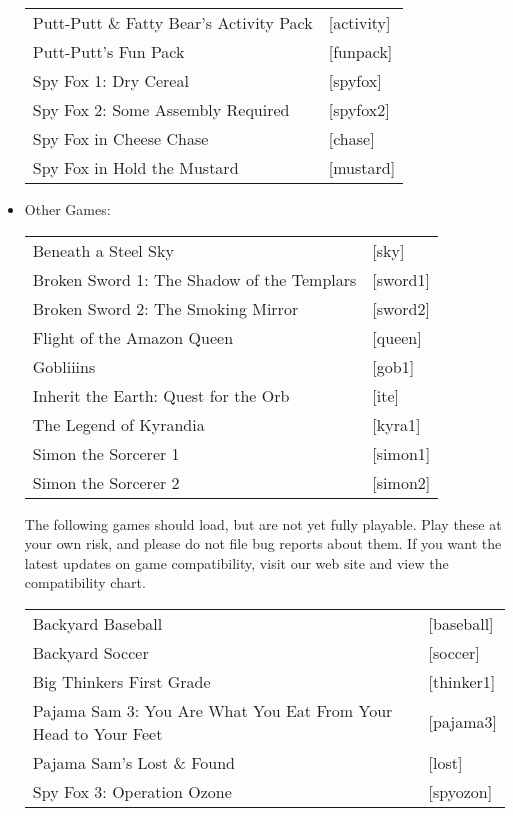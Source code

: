 \begin{itemize}
\begin{tabular}[h]{ll}
    Putt-Putt \& Fatty Bear's Activity Pack&                       [activity]\\
    Putt-Putt's Fun Pack&                                          [funpack]\\
    Spy Fox 1: Dry Cereal&                                         [spyfox]\\
    Spy Fox 2: Some Assembly Required&                             [spyfox2]\\
    Spy Fox in Cheese Chase&                                       [chase]\\
    Spy Fox in Hold the Mustard&                                   [mustard]\\
  \end{tabular}
\item Other Games:\\ 
  \begin{tabular}[h]{ll}
    Beneath a Steel Sky&                           [sky]\\
    Broken Sword 1: The Shadow of the Templars&    [sword1]\\
    Broken Sword 2: The Smoking Mirror&            [sword2]\\
    Flight of the Amazon Queen&                    [queen]\\
    Gobliiins&                                     [gob1]\\
    Inherit the Earth: Quest for the Orb&          [ite]\\
    The Legend of Kyrandia&                        [kyra1]\\
    Simon the Sorcerer 1&                          [simon1]\\
    Simon the Sorcerer 2&                          [simon2]\\
  \end{tabular}

  The following games should load, but are not yet fully playable. Play these at your own risk, and please do not file bug reports about them. If you want
the latest updates on game compatibility, visit our web site and view the
compatibility chart.

\begin{tabular}{ll}
  Backyard Baseball&                                             [baseball]\\
  Backyard Soccer&                                               [soccer]\\
  Big Thinkers First Grade&                                      [thinker1]\\
  Pajama Sam 3: You Are What You Eat From Your Head to Your Feet&[pajama3]\\
  Pajama Sam's Lost \& Found&                                    [lost]\\
  Spy Fox 3: Operation Ozone&                                    [spyozon]\\
\end{tabular}


\end{itemize}
